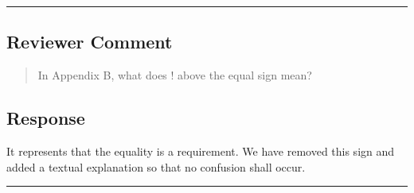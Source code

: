 \noindent\rule{17cm}{2.0pt}

\subsection{Reviewer Comment}
\begin{mdframed}
\begin{quote}
In Appendix B, what does ! above the equal sign mean?
\end{quote}
\end{mdframed}

\subsection{Response} 
It represents that the equality is a requirement. We have removed this sign and added a textual explanation so that no confusion shall occur.


\noindent\rule{17cm}{6.0pt}